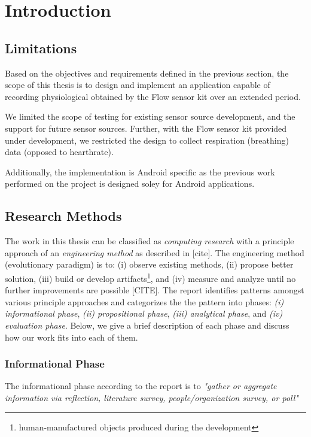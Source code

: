 \chapter{Introduction}\label{introduction}




\section{Limitations}
Based on the objectives and requirements defined in the previous section, the scope of this thesis is to design and implement an application capable of recording physiological obtained by the Flow sensor kit over an extended period. 

We limited the scope of testing for existing sensor source development, and the support for future sensor sources. Further, with the Flow sensor kit provided under development, we restricted the design to collect respiration (breathing) data (opposed to hearthrate).

Additionally, the implementation is Android specific as the previous work performed on the project is designed soley for Android applications. 

\section{Research Methods}
The work in this thesis can be classified as \textit{computing research} with a principle approach of an \textit{engineering method} as described in [cite]. The engineering method (evolutionary paradigm) is to: (i) observe existing methods, (ii) propose better solution, (iii)  build or develop artifacts\footnote{human-manufactured objects produced during the development}, and (iv) measure and analyze until no further improvements are possible [CITE]. The report identifies patterns amongst various principle approaches and categorizes the the pattern into phases: \textit{(i) informational phase}, \textit{(ii) propositional phase}, \textit{(iii) analytical phase}, and \textit{(iv) evaluation phase}. Below, we give a brief description of each phase and discuss how our work fits into each of them. 

\subsection{Informational Phase}
The informational phase according to the report is to \textit{"gather or aggregate information via reflection, literature survey, people/organization survey, or poll"}

